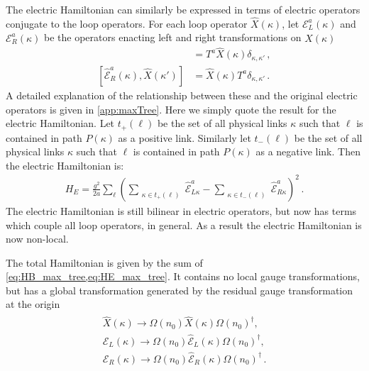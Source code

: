 \documentclass[reprint,superscriptaddress,pra,nofootinbib,preprintnumbers,floatfix]{revtex4-1}
\begin{document}
The electric Hamiltonian can similarly be expressed in terms of electric operators conjugate to the loop operators. 
%
For each loop operator $\hat X(\kappa)$, let $\mathcal{E}_L^a(\kappa)$ and $\mathcal{E}_R^a(\kappa)$ be the operators enacting left and right transformations on $\hat X(\kappa)$
%
\begin{align}
    [\hat{\mathcal{E}}_L^a(\kappa), \hat X(\kappa')] &= T^a \hat X(\kappa) \delta_{\kappa,\kappa'} \,,\\[10pt]
    [ \hat{\mathcal{E}}_R^a(\kappa), \hat X(\kappa')] &= \hat X(\kappa) T^a \delta_{\kappa,\kappa'}
    \,.
\end{align}
%
A detailed explanation of the relationship between these and the original electric operators is given in \cref{app:maxTree}. 
%
Here we simply quote the result for the electric Hamiltonian. 
%
Let $t_{+}(\ell)$ be the set of all physical links $\kappa$ such that $\ell$ is contained in path $P(\kappa)$ as a positive link. 
%
Similarly let $t_{-}(\ell)$ be the set of all physical links $\kappa$ such that $\ell$ is contained in path $P(\kappa)$ as a negative link. 
%
Then the electric Hamiltonian is:
%
\begin{align}
\label{eq:HE_max_tree}
    H_E = \frac{g^2}{2 a} \sum_{\ell} \left( \sum_{\substack{\kappa \in t_+(\ell)}} \hat{\mathcal{E}}^a_{L\kappa} - \sum_{ \substack{ \kappa \in t_{-}(\ell)} } \hat{\mathcal{E}}^{a}_{R\kappa} \right)^2
    \,.
\end{align}
%
The electric Hamiltonian is still bilinear in electric operators, but now has terms which couple all loop operators, in general. %
As a result the electric Hamiltonian is now non-local.

The total Hamiltonian is given by the sum of \cref{eq:HB_max_tree,eq:HE_max_tree}. 
%
It contains no local gauge transformations, but has a global transformation generated by the residual gauge transformation at the origin
%
\begin{align}
\label{eq:gauge_trafo_at_origin}
\begin{split}
    \hat X(\kappa) \to \Omega(n_0) \hat X(\kappa) \Omega(n_0)^\dagger, \\
    \hat{\mathcal{E}}_L(\kappa) \to \Omega(n_0) \hat{\mathcal{E}}_L(\kappa) \Omega(n_0)^\dagger, \\
    \hat{\mathcal{E}}_R(\kappa) \to \Omega(n_0) \hat{\mathcal{E}}_R(\kappa) \Omega(n_0)^\dagger
    \,.
\end{split}
\end{align}
\end{document}
